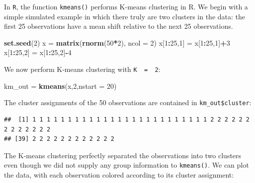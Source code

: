\documentclass[
  openany]{book}
\newenvironment{Shaded}{\begin{snugshade}}{\end{snugshade}}
\newcommand{\DataTypeTok}[1]{\textcolor[rgb]{0.13,0.29,0.53}{#1}}
\newcommand{\DecValTok}[1]{\textcolor[rgb]{0.00,0.00,0.81}{#1}}
\newcommand{\KeywordTok}[1]{\textcolor[rgb]{0.13,0.29,0.53}{\textbf{#1}}}
\newcommand{\NormalTok}[1]{#1}
\newcommand{\OperatorTok}[1]{\textcolor[rgb]{0.81,0.36,0.00}{\textbf{#1}}}
\newcommand{\StringTok}[1]{\textcolor[rgb]{0.31,0.60,0.02}{#1}}
\begin{document}
In \texttt{R}, the function \texttt{kmeans()} performs K-means clustering in R. We begin with
a simple simulated example in which there truly are two clusters in the
data: the first 25 observations have a mean shift relative to the next 25
observations.

\begin{Shaded}
\begin{Highlighting}[]
\KeywordTok{set.seed}\NormalTok{(}\DecValTok{2}\NormalTok{)}
\NormalTok{x =}\StringTok{ }\KeywordTok{matrix}\NormalTok{(}\KeywordTok{rnorm}\NormalTok{(}\DecValTok{50}\OperatorTok{*}\DecValTok{2}\NormalTok{), }\DataTypeTok{ncol =} \DecValTok{2}\NormalTok{)}
\NormalTok{x[}\DecValTok{1}\OperatorTok{:}\DecValTok{25}\NormalTok{,}\DecValTok{1}\NormalTok{] =}\StringTok{ }\NormalTok{x[}\DecValTok{1}\OperatorTok{:}\DecValTok{25}\NormalTok{,}\DecValTok{1}\NormalTok{]}\OperatorTok{+}\DecValTok{3}
\NormalTok{x[}\DecValTok{1}\OperatorTok{:}\DecValTok{25}\NormalTok{,}\DecValTok{2}\NormalTok{] =}\StringTok{ }\NormalTok{x[}\DecValTok{1}\OperatorTok{:}\DecValTok{25}\NormalTok{,}\DecValTok{2}\NormalTok{]}\OperatorTok{-}\DecValTok{4}
\end{Highlighting}
\end{Shaded}

We now perform K-means clustering with \texttt{K\ \ =\ \ 2}:

\begin{Shaded}
\begin{Highlighting}[]
\NormalTok{km_out =}\StringTok{ }\KeywordTok{kmeans}\NormalTok{(x,}\DecValTok{2}\NormalTok{,}\DataTypeTok{nstart =} \DecValTok{20}\NormalTok{)}
\end{Highlighting}
\end{Shaded}

The cluster assignments of the 50 observations are contained in
\texttt{km\_out\$cluster}:

\begin{Shaded}
\end{Shaded}

\begin{verbatim}
##  [1] 1 1 1 1 1 1 1 1 1 1 1 1 1 1 1 1 1 1 1 1 1 1 1 1 1 2 2 2 2 2 2 2 2 2 2 2 2 2
## [39] 2 2 2 2 2 2 2 2 2 2 2 2
\end{verbatim}

The K-means clustering perfectly separated the observations into two clusters
even though we did not supply any group information to \texttt{kmeans()}. We
can plot the data, with each observation colored according to its cluster
assignment:
\end{document}

